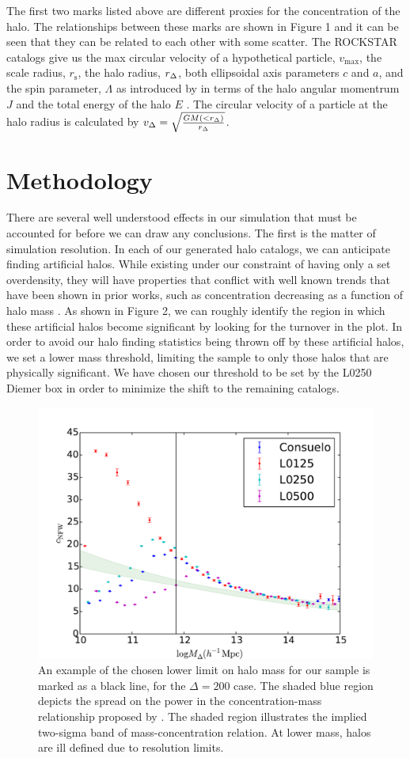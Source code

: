 \documentclass[usenatbib,usegraphicx,letterpaper]{mn2e}
\begin{document}
The first two marks listed above are different proxies for the concentration of the halo. The relationships between these marks are shown in Figure 1 and it can be seen that they can be related to each other with some scatter. The ROCKSTAR catalogs give us the max  circular velocity of a hypothetical particle, $v_{\mathrm{max}}$, the scale radius, $r_{\mathrm{s}}$, the halo radius, $r_{\Delta}$, both ellipsoidal axis parameters $c$ and $a$, and the spin parameter, $\Lambda$ as introduced by \citep{peebles69} in terms of the halo angular momentrum $J$ and the total energy of the halo $E$ . The circular velocity of a particle at the halo radius is calculated by $v_{\Delta} = \sqrt{\frac{G M(< r_{\Delta})}{r_{\Delta}}}$.

\section[]{Methodology}
\label{section:methodology}

There are several well understood effects in our simulation that must be accounted for before we can draw any conclusions. The first is the matter of simulation resolution. In each of our generated halo catalogs, we can anticipate finding artificial halos. While existing under our constraint of having only a set overdensity, they will have properties that conflict with well known trends that have been shown in prior works, such as concentration decreasing as a function of halo mass \citep{wechsler06}. As shown in Figure 2, we can roughly identify the region in which these artificial halos become significant by looking for the turnover in the plot. In order to avoid our halo finding statistics being thrown off by these artificial halos, we set a lower mass threshold, limiting the sample to only those halos that are physically significant. We have chosen our threshold to be set by the L0250 Diemer box in order to minimize the shift to the remaining catalogs.

\begin{figure}
	\centering
		\includegraphics[width=.5\textwidth]{masscut_cnfw_d200.pdf}
	\caption{An example of the chosen lower limit on halo mass for our sample is marked as a black line, for the $\Delta = 200$ case. The shaded blue region depicts the spread on the power in the concentration-mass relationship proposed by \citet{duffy08}.  The shaded region illustrates the implied two-sigma band of \citet{duffy08} mass-concentration relation. At lower mass, halos are ill defined due to resolution limits.}
\end{figure}
\end{document}
